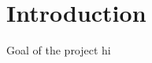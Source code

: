 \renewcommand*\chapterpagestyle{scrheadings}
\chapter{Introduction}
Goal of the project
\newpage
hi
